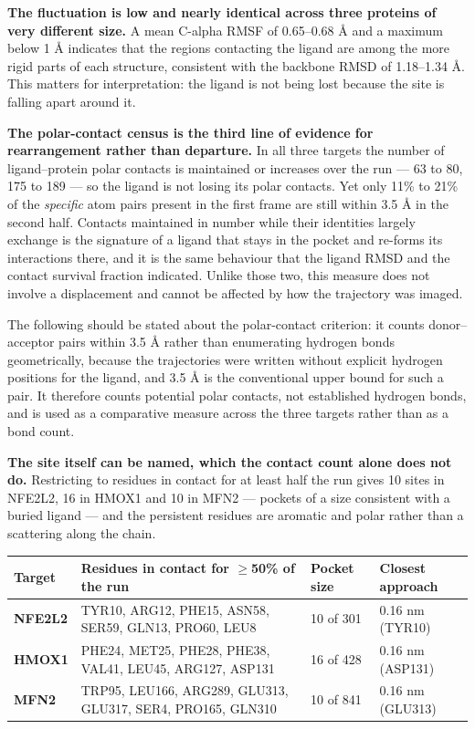 \documentclass[utf8]{FrontiersinVancouver}
\begin{document}
\textbf{The fluctuation is low and nearly identical across three proteins of very different size.} A mean C-alpha RMSF of 0.65--0.68 \AA{} and a maximum below 1 \AA{} indicates that the regions contacting the ligand are among the more rigid parts of each structure, consistent with the backbone RMSD of 1.18--1.34 \AA{}. This matters for interpretation: the ligand is not being lost because the site is falling apart around it.

\textbf{The polar-contact census is the third line of evidence for rearrangement rather than departure.} In all three targets the number of ligand--protein polar contacts is maintained or increases over the run --- 63 to 80, 175 to 189 --- so the ligand is not losing its polar contacts. Yet only 11\% to 21\% of the \textit{specific} atom pairs present in the first frame are still within 3.5 \AA{} in the second half. Contacts maintained in number while their identities largely exchange is the signature of a ligand that stays in the pocket and re-forms its interactions there, and it is the same behaviour that the ligand RMSD and the contact survival fraction indicated. Unlike those two, this measure does not involve a displacement and cannot be affected by how the trajectory was imaged.

The following should be stated about the polar-contact criterion: it counts donor--acceptor pairs within 3.5 \AA{} rather than enumerating hydrogen bonds geometrically, because the trajectories were written without explicit hydrogen positions for the ligand, and 3.5 \AA{} is the conventional upper bound for such a pair. It therefore counts potential polar contacts, not established hydrogen bonds, and is used as a comparative measure across the three targets rather than as a bond count.

\textbf{The site itself can be named, which the contact count alone does not do.} Restricting to residues in contact for at least half the run gives 10 sites in NFE2L2, 16 in HMOX1 and 10 in MFN2 --- pockets of a size consistent with a buried ligand --- and the persistent residues are aromatic and polar rather than a scattering along the chain.

\begin{table}[htbp]
\centering
\begin{tabular}{llll}
\hline
Target & Residues in contact for $\geq$50\% of the run & Pocket size & Closest approach \\
\hline
\textbf{NFE2L2} & TYR10, ARG12, PHE15, ASN58, SER59, GLN13, PRO60, LEU8 & 10 of 301 & 0.16 nm (TYR10) \\
\textbf{HMOX1} & PHE24, MET25, PHE28, PHE38, VAL41, LEU45, ARG127, ASP131 & 16 of 428 & 0.16 nm (ASP131) \\
\textbf{MFN2} & TRP95, LEU166, ARG289, GLU313, GLU317, SER4, PRO165, GLN310 & 10 of 841 & 0.16 nm (GLU313) \\
\hline
\end{tabular}
\end{table}
\end{document}
